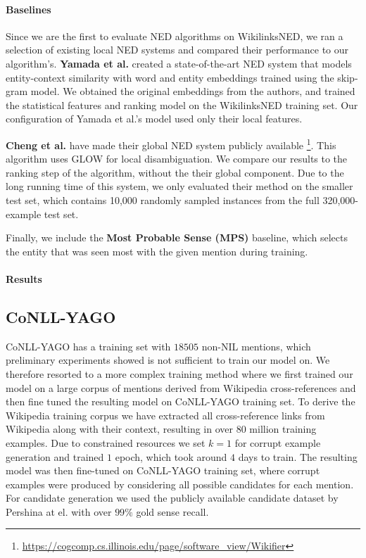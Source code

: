 \documentclass[11pt]{article}
\newcommand\toin{\todo[inline]}
\begin{document}
\paragraph{Baselines}
Since we are the first to evaluate NED algorithms on WikilinksNED, we ran a selection of existing local NED systems and compared their performance to our algorithm's. \textbf{Yamada et al.}  created a state-of-the-art NED system that models entity-context similarity with word and entity embeddings trained using the skip-gram model. We obtained the original embeddings from the authors, and trained the statistical features and ranking model on the WikilinksNED training set. Our configuration of Yamada et al.'s model used only their local features.

\textbf{Cheng et al.}  have made their global NED system publicly available \footnote{\url{https://cogcomp.cs.illinois.edu/page/software\_view/Wikifier}}. This algorithm uses GLOW \cite{Ratinov2011} for local disambiguation. We compare our results to the ranking step of the algorithm, without the their global component. Due to the long running time of this system, we only evaluated their method on the smaller test set, which contains 10,000 randomly sampled instances from the full 320,000-example test set.

Finally, we include the \textbf{Most Probable Sense (MPS)} baseline, which selects the entity that was seen most with the given mention during training.

\paragraph{Results}
\toin{Results on WikilinksNED should be here.}


\subsection{CoNLL-YAGO}

CoNLL-YAGO has a training set with $18505$ non-NIL mentions, which preliminary experiments showed is not sufficient to train our model on. We therefore resorted to a more complex training method where we first trained our model on a large corpus of mentions derived from Wikipedia cross-references and then fine tuned the resulting model on CoNLL-YAGO training set. To derive the Wikipedia training corpus we have extracted all cross-reference links from Wikipedia along with their context, resulting in over $80$ million training examples. Due to constrained resources we set $k=1$ for corrupt example generation and trained $1$ epoch, which took around $4$ days to train. The resulting model was then fine-tuned on CoNLL-YAGO training set, where corrupt examples were produced by considering all possible candidates for each mention.
For candidate generation we used the publicly available candidate dataset by Pershina at el.  with over $99\%$ gold sense recall.
\end{document}
